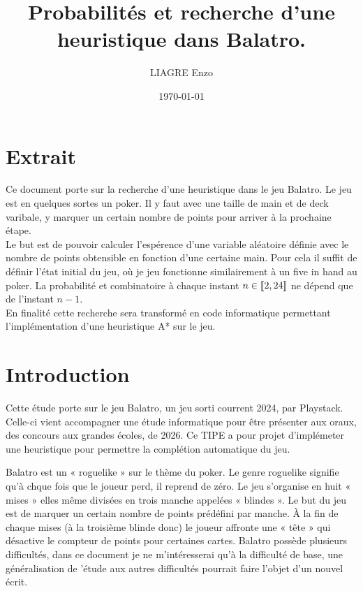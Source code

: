 \documentclass[10pt]{report}
\title{Probabilités et recherche d'une heuristique dans Balatro.}
\author{LIAGRE Enzo}
\date{\today}
\begin{document}
    \maketitle

    \chapter*{Extrait}
    Ce document porte sur la recherche d'une heuristique dans le jeu Balatro.
    Le jeu est en quelques sortes un poker. Il y faut avec une taille de main 
    et de deck varibale, y marquer un certain nombre de points pour arriver à 
    la prochaine étape.
    \\ Le but est de pouvoir calculer l'espérence d'une variable aléatoire 
    définie avec le nombre de points obtensible en fonction d'une certaine main.
    Pour cela il suffit de définir l'état initial du jeu, où je jeu fonctionne 
    similairement à un five in hand au poker.
    La probabilité et combinatoire à chaque instant 
    $n \in [\![2, \space 24]\!]$ ne dépend que de l'instant $n-1$.
    \\ En finalité cette recherche sera transformé en code informatique 
    permettant l'implémentation d'une heuristique A* sur le jeu.

    \tableofcontents

    \chapter{Introduction}
    Cette étude porte sur le jeu Balatro, un jeu sorti courrent 2024, par Playstack.
    Celle-ci vient accompagner une étude informatique pour être présenter 
    aux oraux, des concours aux grandes écoles, de 2026.
    Ce TIPE a pour projet d'implémeter une heuristique pour permettre la 
    complétion automatique du jeu. 
    
    Balatro est un « roguelike » sur le thème du poker. Le genre roguelike 
    signifie qu'à chque fois que le joueur perd, il reprend de zéro.
    Le jeu s'organise en huit « mises » elles même divisées en trois manche 
    appelées « blindes ».
    Le but du jeu est de marquer un certain nombre de points prédéfini par manche.
    À la fin de chaque mises (à la troisième blinde donc) le joueur affronte 
    une « tête » qui désactive le compteur de points pour certaines cartes.
    Balatro possède plusieurs difficultés, dans ce document je ne 
    m'intéresserai qu'à la difficulté de base, une généralisation de 
    'étude aux autres difficultés pourrait faire l'objet d'un nouvel écrit.
\end{document}
